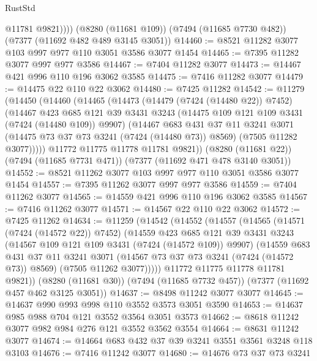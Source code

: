 \begin{lexlean}{RustStd}
\begin{coremodule}
            @11781
            @9821))))
    (@8280 (@11681 @109))
    (@7494 (@11685 @7730 @482))
    (@7377 (@11692 @482 @489 @3145 @3051))
@14460 := @8521 @11282 @3077 @103 @997 @977 @110 @3051 @3586 @3077 @1454
@14465 := @7395 @11282 @3077 @997 @977 @3586
@14467 := @7404 @11282 @3077
@14473 := @14467 @421 @996 @110 @196 @3062 @3585
@14475 := @7416 @11282 @3077
@14479 := @14475 @22 @110 @22 @3062
@14480 := @7425 @11282
@14542 := @11279
    (@14450
      (@14460
        (@14465
          (@14473
            (@14479 (@7424 (@14480 @22)) @7452)
            (@14467
              @423
              @685
              @121
              @39
              @3431
              @3243
              (@14475 @109 @121 @109 @3431 (@7424 (@14480 @109)) @9907)
              (@14467
                @683
                @431
                @37
                @11
                @3241
                @3071
                (@14475 @73 @37 @73 @3241 (@7424 (@14480 @73)) @8569)
                (@7505 @11282 @3077)))))
        @11772
        @11775
        @11778
        @11781
        @9821))
    (@8280 (@11681 @22))
    (@7494 (@11685 @7731 @471))
    (@7377 (@11692 @471 @478 @3140 @3051))
@14552 := @8521 @11262 @3077 @103 @997 @977 @110 @3051 @3586 @3077 @1454
@14557 := @7395 @11262 @3077 @997 @977 @3586
@14559 := @7404 @11262 @3077
@14565 := @14559 @421 @996 @110 @196 @3062 @3585
@14567 := @7416 @11262 @3077
@14571 := @14567 @22 @110 @22 @3062
@14572 := @7425 @11262
@14634 := @11259
    (@14542
      (@14552
        (@14557
          (@14565
            (@14571 (@7424 (@14572 @22)) @7452)
            (@14559
              @423
              @685
              @121
              @39
              @3431
              @3243
              (@14567 @109 @121 @109 @3431 (@7424 (@14572 @109)) @9907)
              (@14559
                @683
                @431
                @37
                @11
                @3241
                @3071
                (@14567 @73 @37 @73 @3241 (@7424 (@14572 @73)) @8569)
                (@7505 @11262 @3077)))))
        @11772
        @11775
        @11778
        @11781
        @9821))
    (@8280 (@11681 @30))
    (@7494 (@11685 @7732 @457))
    (@7377 (@11692 @457 @462 @3125 @3051))
@14637 := @8498 @11242 @3077 @3077
@14645 := @14637 @990 @993 @998 @110 @3552 @3573 @3051 @3590
@14653 := @14637 @985 @988 @704 @121 @3552 @3564 @3051 @3573
@14662 := @8618 @11242 @3077 @982 @984 @276 @121 @3552 @3562 @3554
@14664 := @8631 @11242 @3077
@14674 := @14664 @683 @432 @37 @39 @3241 @3551 @3561 @3248 @118 @3103
@14676 := @7416 @11242 @3077
@14680 := @14676 @73 @37 @73 @3241

\end{coremodule}
\end{lexlean}
